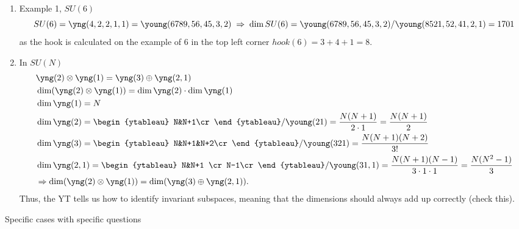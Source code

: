 \begin{enumerate}
	\item Example 1, $SU(6)$ 
	\begin{equation}
		SU(6) = \yng(4,2,2,1,1)=\young(6789,56,45,3,2)  \;\Rightarrow\; \dim SU(6) = \young(6789,56,45,3,2) / \young(8521,52,41,2,1)=1701
	\end{equation}
	as the hook is calculated on the example of $6$ in the top left corner $hook(6)=3+4+1=8$.
	\item In $SU(N)$
	\begin{align*}
		&\yng(2) \otimes \yng(1) = \yng(3) \oplus \yng(2,1)\\
		&\dim(\yng(2)\otimes \yng(1)) = \dim \yng(2) \cdot \dim\yng(1) \\
		&\dim\yng(1) =N\\
		&\dim\yng(2)=
		\begin{ytableau}
		N&N+1\cr
		\end{ytableau}
	/\young(21) = \frac{N(N+1)}{2\cdot 1} = \frac{N(N+1)}{2}\\
&\dim \yng(3) = \begin{ytableau}
		N&N+1&N+2\cr 
	\end{ytableau}
/\young(321) = \frac{N(N+1)(N+2)}{3!}\\
&\dim \yng(2,1) = \begin{ytableau}
	N&N+1 \cr 
	N-1\cr
\end{ytableau}
/\young(31,1)
= \frac{N(N+1)(N-1)}{3\cdot 1\cdot1} = \frac{N(N^2-1)}{3}\\
&\Rightarrow \dim(\yng(2) \otimes \yng(1)) = \dim(\yng(3) \oplus \yng(2,1)).
	\end{align*}
Thus, the YT tells us how to identify invariant subspaces, meaning that the dimensions should always add up correctly (check this).
\end{enumerate}
Specific cases with specific questions
